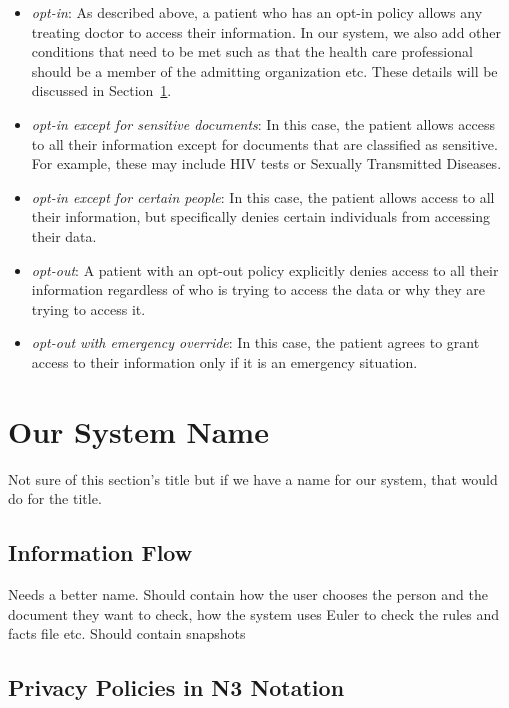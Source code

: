\documentclass[conference]{IEEEtran}
\begin{document}
\begin{itemize}
 \item \textit{opt-in}: As described above, a patient who has an opt-in policy allows any treating doctor to access their information. In our system, we also
add other conditions that need to be met such as that the health care professional should be a member of the admitting organization etc. These details will be
discussed in Section~\ref{main-sys}.
\item \textit{opt-in except for sensitive documents}: In this case, the patient allows access to all their information except for documents that are classified
as sensitive. For example, these may include HIV tests or Sexually Transmitted Diseases. 
\item \textit{opt-in except for certain people}: In this case, the patient allows access to all their information, but specifically denies certain individuals
from accessing their data.
\item \textit{opt-out}: A patient with an opt-out policy explicitly denies access to all their information regardless of who is trying to access the data or
why they are trying to access it.
\item \textit{opt-out with emergency override}: In this case, the patient agrees to grant access to their information only if it is an emergency situation. 
\end{itemize}

\section{Our System Name}
\label{main-sys}

Not sure of this section's title but if we have a name for our system, that would do for the title. 

\subsection{Information Flow}
\label{info-flow}

Needs a better name. Should contain how the user chooses the person and the document they want to check, how the system uses Euler to check the rules and facts file etc. Should contain snapshots

\subsection{Privacy Policies in N3 Notation}
\label{rules-sec}
\end{document}
